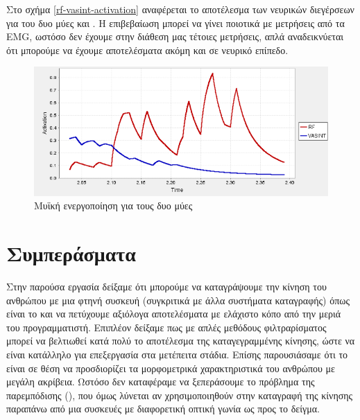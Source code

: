 Στο σχήμα \ref{rf-vasint-activation} αναφέρεται το αποτέλεσμα των νευρικών διεγέρσεων για του δυο μύες  και . Η επιβεβαίωση μπορεί να γίνει ποιοτικά με μετρήσεις από τα EMG, ωστόσο δεν έχουμε στην διάθεση μας τέτοιες μετρήσεις, απλά αναδεικνύεται ότι μπορούμε να έχουμε αποτελέσματα ακόμη και σε νευρικό επίπεδο.

\begin{figure}[H]
    \centering
    \includegraphics[width=0.8\linewidth, keepaspectratio]{fig/rf-vasint-activation.png}
    \caption{Μυϊκή ενεργοποίηση για τους δυο μύες}
    \label{fig:rf-vasint-activation}
\end{figure}


\section{Συμπεράσματα}

Στην παρούσα εργασία δείξαμε ότι μπορούμε να καταγράψουμε την κίνηση του ανθρώπου με μια φτηνή συσκευή (συγκριτικά με άλλα συστήματα καταγραφής) όπως είναι το  και να πετύχουμε αξιόλογα αποτελέσματα με ελάχιστο κόπο από την μεριά του προγραμματιστή. Επιπλέον δείξαμε πως με απλές μεθόδους φιλτραρίσματος μπορεί να βελτιωθεί κατά πολύ το αποτέλεσμα της καταγεγραμμένης κίνησης, ώστε να είναι κατάλληλο για επεξεργασία στα μετέπειτα στάδια. Επίσης παρουσιάσαμε ότι το  είναι σε θέση να προσδιορίζει τα μορφομετρικά χαρακτηριστικά του ανθρώπου με μεγάλη ακρίβεια. Ωστόσο δεν καταφέραμε να ξεπεράσουμε το πρόβλημα της παρεμπόδισης (), που όμως λύνεται αν χρησιμοποιηθούν στην καταγραφή της κίνησης παραπάνω από μια συσκευές με διαφορετική οπτική γωνία ως προς το δείγμα.

